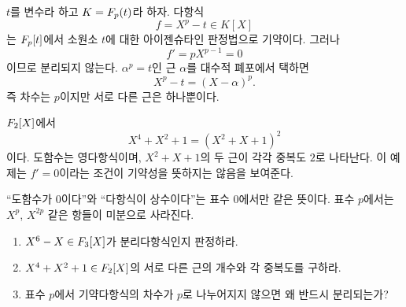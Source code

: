 \begin{example}
$t$를 변수라 하고 $K=F_p(t)$라 하자. 다항식
\[
  f=X^p-t\in K[X]
\]
는 $F_p[t]$에서 소원소 $t$에 대한 아이젠슈타인 판정법으로 기약이다. 그러나
\[
  f'=pX^{p-1}=0
\]
이므로 분리되지 않는다. $\alpha^p=t$인 근 $\alpha$를 대수적 폐포에서 택하면
\[
  X^p-t=(X-\alpha)^p.
\]
즉 차수는 $p$이지만 서로 다른 근은 하나뿐이다.
\end{example}

\begin{example}
$F_2[X]$에서
\[
  X^4+X^2+1=(X^2+X+1)^2
\]
이다. 도함수는 영다항식이며, $X^2+X+1$의 두 근이 각각 중복도 $2$로 나타난다. 이 예제는 $f'=0$이라는 조건이 기약성을 뜻하지는 않음을 보여준다.
\end{example}

\begin{pitfall}
``도함수가 $0$이다''와 ``다항식이 상수이다''는 표수 $0$에서만 같은 뜻이다. 표수 $p$에서는 $X^p$, $X^{2p}$ 같은 항들이 미분으로 사라진다.
\end{pitfall}

\begin{checkpoint}
\begin{enumerate}[label=(\alph*)]
  \item $X^6-X\in F_3[X]$가 분리다항식인지 판정하라.
  \item $X^4+X^2+1\in F_2[X]$의 서로 다른 근의 개수와 각 중복도를 구하라.
  \item 표수 $p$에서 기약다항식의 차수가 $p$로 나누어지지 않으면 왜 반드시 분리되는가?
\end{enumerate}
\end{checkpoint}

